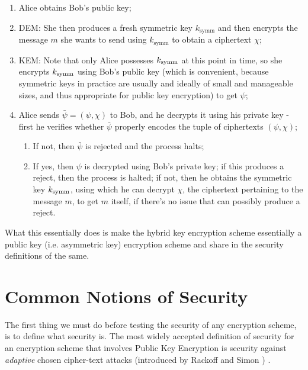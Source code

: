 \begin{enumerate}
    \setlength\itemsep{0.3cm}
    \item Alice obtains Bob's public key;
    \item \textsc{DEM}: She then produces a fresh symmetric key $k_\text{symm}$ and then encrypts the message $m$ she wants to send using $k_\text{symm}$ to obtain a ciphertext $\chi$;
    \item \textsc{KEM}: Note that only Alice possesses $k_{\text{symm}}$ at this point in time, so she encrypts $k_{\text{symm}}$ using Bob's public key (which is convenient, because symmetric keys in practice are usually and ideally of small and manageable sizes, and thus appropriate for public key encryption) to get $\psi$;
    \item Alice sends $\bar\psi=(\psi,\chi)$ to Bob, and he decrypts it using his private key - first he verifies whether $\bar\psi$ properly encodes the tuple of ciphertexts $(\psi,\chi)$;

    \begin{enumerate}
        \item If not, then $\bar\psi$ is rejected and the process halts;
        \item If yes, then $\psi$ is decrypted using Bob's private key; if this produces a reject, then the process is halted; if not, then he obtains the symmetric key $k_{\text{symm}}$, using which he can decrypt $\chi$, the ciphertext pertaining to the message $m$, to get $m$ itself, if there's no issue that can possibly produce a reject.
    \end{enumerate}
\end{enumerate}

What this essentially does is make the hybrid key encryption scheme essentially a public key (i.e. asymmetric key) encryption scheme and share in the security definitions of the same.\\

\section{Common Notions of Security}

The first thing we must do before testing the security of any encryption scheme, is to define what security is. The most widely accepted definition of security for an encryption scheme that involves Public Key Encryption is security against \emph{adaptive} chosen cipher-text attacks (introduced by Rackoff and Simon \cite{RS}) \cite{shoup_cca}.

